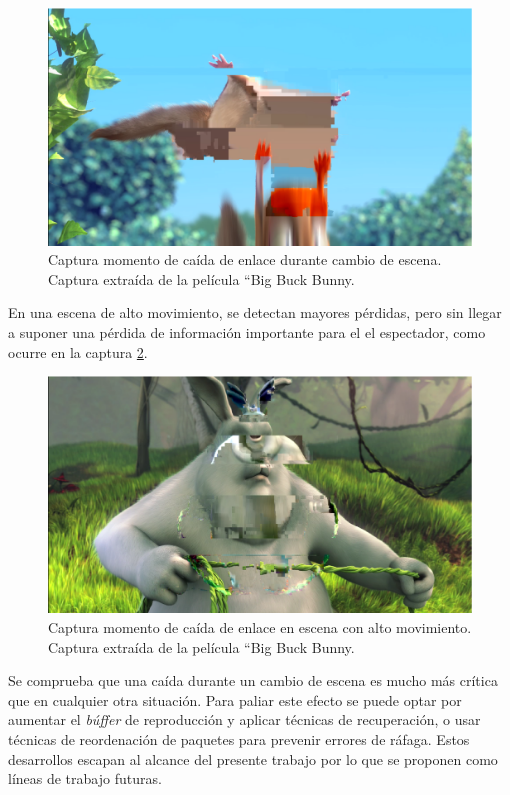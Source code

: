 \documentclass[a4paper,11pt]{book}
\begin{document}
\begin{figure}[h]
\centering
\includegraphics[scale=0.40]{./figuras/subjetiva4}
\caption[Captura momento de caída de enlace durante cambio de escena.]{Captura momento de caída de enlace durante cambio de escena. Captura extraída de la película ``Big Buck Bunny.}
\label{cap:subjetiva4}
\end{figure}

En una escena de alto movimiento, se detectan mayores pérdidas, pero sin llegar a suponer una pérdida de información importante para el el espectador, como ocurre en la captura \ref{cap:subjetiva3}.

\begin{figure}[h]
\centering
\includegraphics[scale=0.40]{./figuras/subjetiva3}
\caption[Captura momento de caída de enlace en escena con alto movimiento.]{Captura momento de caída de enlace en escena con alto movimiento. Captura extraída de la película ``Big Buck Bunny.}
\label{cap:subjetiva3}
\end{figure}

Se comprueba que una caída durante un cambio de escena es mucho más crítica que en cualquier otra situación. Para paliar este efecto se puede optar por aumentar el \textit{búffer} de reproducción y aplicar técnicas de recuperación, o usar técnicas de reordenación de paquetes para prevenir errores de ráfaga. Estos desarrollos escapan al alcance del presente trabajo por lo que se proponen como líneas de trabajo futuras.
\end{document}
